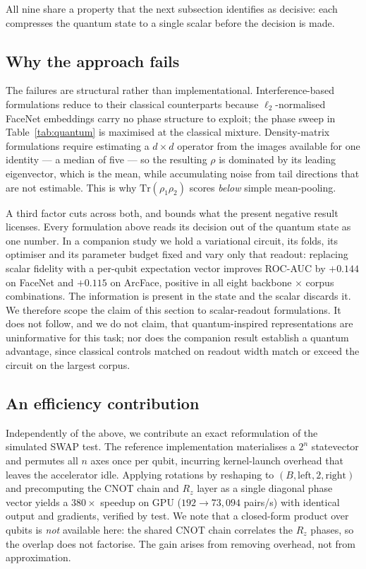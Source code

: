 \documentclass[preprint,12pt]{elsarticle}
\begin{document}
All nine share a property that the next subsection identifies as decisive: each
compresses the quantum state to a single scalar before the decision is made.

\subsection{Why the approach fails}

The failures are structural rather than implementational. Interference-based
formulations reduce to their classical counterparts because $\ell_2$-normalised
FaceNet embeddings carry no phase structure to exploit; the phase sweep in
Table~\ref{tab:quantum} is maximised at the classical mixture. Density-matrix
formulations require estimating a $d \times d$ operator from the images
available for one identity --- a median of five --- so the resulting $\rho$ is
dominated by its leading eigenvector, which is the mean, while accumulating
noise from tail directions that are not estimable. This is why
$\mathrm{Tr}(\rho_1\rho_2)$ scores \emph{below} simple mean-pooling.

A third factor cuts across both, and bounds what the present negative result
licenses. Every formulation above reads its decision out of the quantum state as
one number. In a companion study we hold a variational circuit, its folds, its
optimiser and its parameter budget fixed and vary only that readout: replacing
scalar fidelity with a per-qubit expectation vector improves ROC-AUC by $+0.144$
on FaceNet and $+0.115$ on ArcFace, positive in all eight backbone $\times$
corpus combinations. The information is present in the state and the scalar
discards it. We therefore scope the claim of this section to scalar-readout
formulations. It does not follow, and we do not claim, that quantum-inspired
representations are uninformative for this task; nor does the companion result
establish a quantum advantage, since classical controls matched on readout width
match or exceed the circuit on the largest corpus.

\subsection{An efficiency contribution}

Independently of the above, we contribute an exact reformulation of the
simulated SWAP test. The reference implementation materialises a $2^n$
statevector and permutes all $n$ axes once per qubit, incurring kernel-launch
overhead that leaves the accelerator idle. Applying rotations by reshaping to
$(B, \text{left}, 2, \text{right})$ and precomputing the CNOT chain and $R_z$
layer as a single diagonal phase vector yields a $380\times$ speedup on GPU
($192 \to 73{,}094$ pairs/s) with identical output and gradients, verified by
test. We note that a closed-form product over qubits is \emph{not} available
here: the shared CNOT chain correlates the $R_z$ phases, so the overlap does not
factorise. The gain arises from removing overhead, not from approximation.
\end{document}
